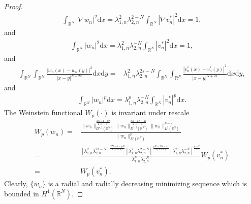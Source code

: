 \documentclass[12pt,a4paper,reqno]{amsart}
\numberwithin{equation}{section}
\begin{document}
\begin{proof}
\begin{equation*}
\begin{aligned}
\int_{\mathbb{R}^{N}}|\nabla w_{n}|^{2}\mathrm{d}x
=
\lambda_{1,n}^{2}
\lambda_{2,n}^{2-N}
\int_{\mathbb{R}^{N}}|\nabla v_{n}^{*}|^{2}\mathrm{d}x=1,
\end{aligned}
\end{equation*}
and
\begin{equation*}
\begin{aligned}
\int_{\mathbb{R}^{N}}|w_{n}|^{2}\mathrm{d}x
=
\lambda_{1,n}^{2}\lambda_{2,n}^{-N}
\int_{\mathbb{R}^{N}}|v_{n}^{*}|^{2}\mathrm{d}x=1,
\end{aligned}
\end{equation*}
and
\begin{equation*}
\begin{aligned}
\int_{\mathbb{R}^{N}}\int_{\mathbb{R}^{N}}\frac{|w_{n}(x)-w_{n}(y)|^{2}}{|x-y|^{N+2s}}\mathrm{d}x\mathrm{d}y
=&
\lambda_{1,n}^{2}
\lambda_{2,n}^{2s-N}
\int_{\mathbb{R}^{N}}\int_{\mathbb{R}^{N}}\frac{|v_{n}^{*}(x)-v_{n}^{*}(y)|^{2}}{|x-y|^{N+2s}}\mathrm{d}x\mathrm{d}y,
\end{aligned}
\end{equation*}
and
\begin{equation*}
\begin{aligned}
\int_{\mathbb{R}^{N}}|w_{n}|^{p}\mathrm{d}x
=\lambda_{1,n}^{p}\lambda_{2,n}^{-N}
\int_{\mathbb{R}^{N}}|v_{n}^{*}|^{p}\mathrm{d}x.
\end{aligned}
\end{equation*}
The Weinstein functional $W_{p}(\cdot)$ is invariant under rescale
\begin{equation*}
\begin{aligned}
W_{p}(w_{n})
=&\frac{
\|w_{n}\|_{D^{s,2}(\mathbb{R}^{N})}^{\frac{2N+4-pN}{2(1-s)}}
\|w_{n}\|_{D^{1,2}(\mathbb{R}^{N})}^{\frac{pN-2N-4s}{2(1-s)}}
\|w_{n}\|_{L^{2}(\mathbb{R}^{N})}^{p-2}
}
{\|w_{n}\|_{L^{p}(\mathbb{R}^{N})}^{p}}\\
=&
\frac{
[\lambda_{1,n}^{2}
\lambda_{2,n}^{2s-N}]^{\frac{2N+4-pN}{4(1-s)}}
[\lambda_{1,n}^{2}
\lambda_{2,n}^{2-N}]^{\frac{pN-2N-4s}{4(1-s)}}
[\lambda_{1,n}^{2}\lambda_{2,n}^{-N}]^{\frac{p-2}{2}}
}
{\lambda_{1,n}^{p}\lambda_{2,n}^{-N}}
W_{p}(v_{n}^{*})\\
=&W_{p}(v_{n}^{*}).
\end{aligned}
\end{equation*}
Clearly, $\{w_{n}\}$ is a radial and radially decreasing minimizing sequence which is bounded in  $H^{1}(\mathbb{R}^{N})$.




\end{proof}
\end{document}
